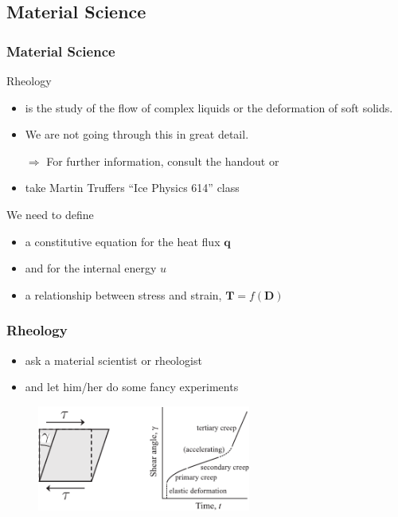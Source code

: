 \documentclass[hide notes,intlimits]{beamer}
\begin{document}
\subsection{Material Science}



\begin{frame}
  \frametitle{Material Science}
  \begin{block}{Rheology}
    \begin{itemize}
    \item is the study of the flow of complex liquids or the deformation of soft solids.
    \item We are not going through this in great detail.
    \item[$\Rightarrow$] For further information, consult the handout or
      \item take Martin Truffers ``Ice Physics 614''  class
    \end{itemize}
  \end{block}
  \begin{block}{We need to define}
    \begin{itemize}
    \item a constitutive equation for the heat flux $\mathbf{q}$
    \item and for the internal energy $u$
    \item a relationship between stress and strain, $\mathbf{T} = f(\mathbf{D})$
   \end{itemize}
  \end{block}
\end{frame}


\begin{frame}
  \frametitle{Rheology}
  \begin{itemize}
    \item ask a material scientist or rheologist
    \item and let him/her do some fancy experiments
 \end{itemize}
  \begin{figure}
  \includegraphics[width=7cm]{figures/fig_4_04}
  \end{figure}
\end{frame}
\end{document}
